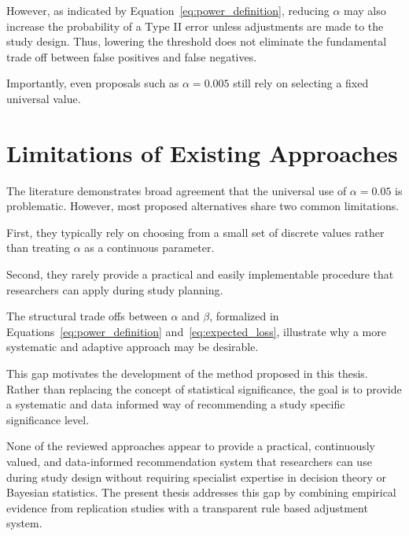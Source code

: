 However, as indicated by Equation~\ref{eq:power_definition}, reducing $\alpha$ may also increase the probability of a Type II error unless adjustments are made to the study design. Thus, lowering the threshold does not eliminate the fundamental trade off between false positives and false negatives.

Importantly, even proposals such as $\alpha = 0.005$ still rely on selecting a fixed universal value.


\section{Limitations of Existing Approaches}
\label{sec:litlmitiations}
The literature demonstrates broad agreement that the universal use of $\alpha = 0.05$ is problematic. However, most proposed alternatives share two common limitations.

First, they typically rely on choosing from a small set of discrete values rather than treating $\alpha$ as a continuous parameter.

Second, they rarely provide a practical and easily implementable procedure that researchers can apply during study planning.

The structural trade offs between $\alpha$ and $\beta$, formalized in Equations~\ref{eq:power_definition} and~\ref{eq:expected_loss}, illustrate why a more systematic and adaptive approach may be desirable.

This gap motivates the development of the method proposed in this thesis. Rather than replacing the concept of statistical significance, the goal is to provide a systematic and data informed way of recommending a study specific significance level.

None of the reviewed approaches appear to provide a practical, continuously valued, and data-informed recommendation system that researchers can use during study design without requiring specialist expertise in decision theory or Bayesian statistics. The present thesis addresses this 
gap by combining empirical evidence from replication studies with 
a transparent rule based adjustment system.




